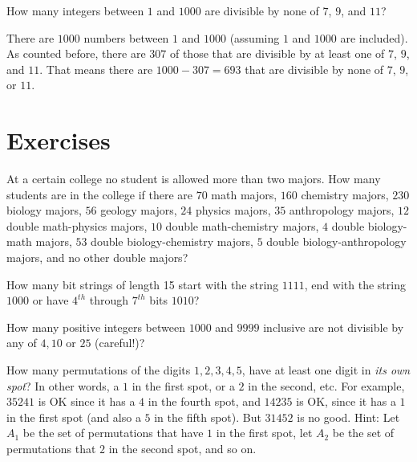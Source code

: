 \begin{exmp}
 How many integers between $1$ and $1000$ are divisible by none of
 $7$, $9$, and $11$?
\end{exmp}
\begin{soln}
 There are $1000$ numbers between $1$ and $1000$ (assuming $1$ and $1000$ are included). 
 As counted before, there are $307$ of those that are divisible by at least one of $7$, $9$, and $11$.
 That means there are $1000-307 = 693$ that are divisible by none of $7$, $9$, or $11$.
\end{soln}
 
\clearpage
\section{Exercises}

\begin{exer}
At a certain college no student is allowed more than two majors.
How many students are in the college if there are $70$ math majors, $160$ chemistry majors,
$230$ biology majors, $56$ geology majors, $24$ physics majors, $35$ anthropology majors,
$12$ double math-physics majors, $10$ double math-chemistry majors, $4$ double biology-math
majors, $53$ double biology-chemistry majors, $5$ double biology-anthropology majors,
and no other double majors? 
\end{exer}

\begin{exer}
How many bit strings of length 15 start with the string $1111$, end with the string $1000$ or
have $4^{th}$ through $7^{th}$ bits $1010$?
\end{exer}

\begin{exer}
How many positive integers between $1000$ and $9999$ inclusive are not divisible by
any of $4,10$ or $25$ (careful!)?
\end{exer}

\begin{exer}
How many permutations of the digits $1,2,3,4,5$, have at least one digit in {\it its
own spot}? In other words, a $1$ in the first spot, or a $2$ in the second, etc.
For example, $35241$ is OK since it has a $4$ in the fourth spot, and $14235$ is OK, since
it has a $1$ in the first spot (and also a $5$ in the fifth spot). But $31452$ is no good.
Hint: Let $A_1$ be the set of permutations that have $1$ in the first spot, let $A_2$ be
the set of permutations that $2$ in the second spot, and so on.
\end{exer}

